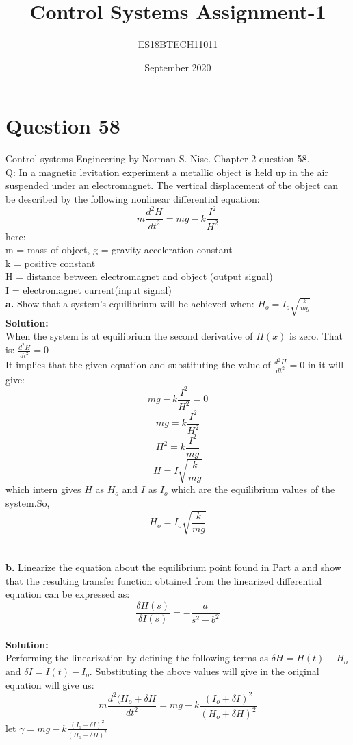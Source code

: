\documentclass[20pt]{article}
\title{Control Systems Assignment-1}
\author{ES18BTECH11011}
\date{September 2020}
\begin{document}
\maketitle

\section{Question 58}
Control systems Engineering by Norman S. Nise. Chapter 2 question 58.\\
Q: In a magnetic levitation experiment a metallic object is held up in the air suspended under an electromagnet. The vertical displacement of the object can be described by the following nonlinear differential equation:
$$ m\frac{d^2H}{dt^2} = mg -k\frac{I^2}{H^2} $$
here:\\ 
m = mass of object, g = gravity acceleration constant\\
k = positive constant\\
H = distance between electromagnet and object (output signal)\\
I = electromagnet current(input signal) \\

\noindent \textbf{a.} Show that a system's equilibrium will be achieved when: $ H_o = I_o\sqrt{\frac{k}{mg}} $
\textbf{Solution:}\\
When the system is at equilibrium the second derivative of $H(x)$ is zero. That is: $\frac{d^2H}{dt^2} = 0 $ \\
It implies that the given equation and substituting the value of $\frac{d^2H}{dt^2} = 0 $ in it will give:
    $$ mg -k\frac{I^2}{H^2} = 0 $$
    $$ mg = k\frac{I^2}{H^2} $$
    $$ {H^2} = k\frac{I^2}{mg} $$
    $$ H = I\sqrt{\frac{k}{mg}} $$
    which intern gives $ H $ as $ H_o $ and $ I $ as $ I_o $ which are the equilibrium values of the system.So,
    $$ H_o = I_o\sqrt{\frac{k}{mg}} $$
\\
\\
\noindent \textbf{b.} Linearize the equation about the equilibrium point found in Part a and show that the resulting transfer function obtained from the linearized differential equation can be expressed as: 
    $$ \frac{\delta H(s)}{\delta I(s)} = - \frac{a}{s^2-b^2} $$\\
\textbf{Solution:}\\
Performing the linearization by defining the following terms as $\delta H = H(t) - H_o$ and $\delta I = I(t) - I_o$. Substituting the above values will give in the original equation will give us:
$$ m\frac{d^2(H_o + \delta H}{dt^2} = mg - k\frac{(I_o + \delta I)^2}{(H_o + \delta H)^2} $$
let $ \gamma = mg - k\frac{(I_o + \delta I)^2}{(H_o + \delta H)^2}$\\
\end{document}
